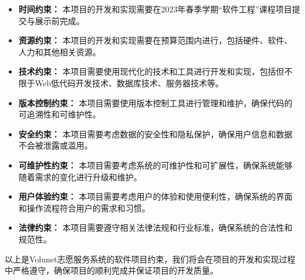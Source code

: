 \begin{itemize}[itemsep=2pt,topsep=0pt,parsep=4pt,itemindent=1em]
    \item \textbf{时间约束：} 本项目的开发和实现需要在2023年春季学期“软件工程”课程项目提交与展示前完成。
    \item \textbf{资源约束：} 本项目的开发和实现需要在预算范围内进行，包括硬件、软件、人力和其他相关资源。
    \item \textbf{技术约束：} 本项目需要使用现代化的技术和工具进行开发和实现，包括但不限于Web低代码开发技术、数据库技术、服务器技术等。
    \item \textbf{版本控制约束：} 本项目需要使用版本控制工具进行管理和维护，确保代码的可追溯性和可维护性。
    \item \textbf{安全约束：} 本项目需要考虑数据的安全性和隐私保护，确保用户信息和数据不会被泄露或滥用。
    \item \textbf{可维护性约束：} 本项目需要考虑系统的可维护性和可扩展性，确保系统能够随着需求的变化进行升级和维护。
    \item \textbf{用户体验约束：} 本项目需要考虑用户的体验和使用便利性，确保系统的界面和操作流程符合用户的需求和习惯。
    \item \textbf{法律约束：} 本项目需要遵守相关法律法规和行业标准，确保系统的合法性和规范性。
\end{itemize}


以上是Volunet志愿服务系统的软件项目约束，我们将会在项目的开发和实现过程中严格遵守，确保项目的顺利完成并保证项目的开发质量。

\newpage